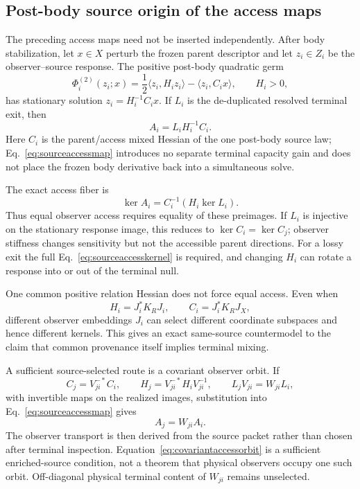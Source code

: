 \subsection{Post-body source origin of the access maps}

The preceding access maps need not be inserted independently. After body
stabilization, let $x\in X$ perturb the frozen parent descriptor and let
$z_i\in Z_i$ be the observer--source response. The positive post-body
quadratic germ
\begin{equation}
 \Phi_i^{(2)}(z_i;x)
 =\frac12\langle z_i,H_i z_i\rangle-\langle z_i,C_i x\rangle,
 \qquad H_i>0,
 \label{eq:accesssourcegerm}
\end{equation}
has stationary solution $z_i=H_i^{-1}C_i x$. If $L_i$ is the de-duplicated
resolved terminal exit, then
\begin{equation}
 \boxed{A_i=L_iH_i^{-1}C_i.}
 \label{eq:sourceaccessmap}
\end{equation}
Here $C_i$ is the parent/access mixed Hessian of the one post-body source law;
Eq.~\eqref{eq:sourceaccessmap} introduces no separate terminal capacity gain
and does not place the frozen body derivative back into a simultaneous solve.

The exact access fiber is
\begin{equation}
 \ker A_i=C_i^{-1}\!\left(H_i\ker L_i\right).
 \label{eq:sourceaccesskernel}
\end{equation}
Thus equal observer access requires equality of these preimages. If $L_i$ is
injective on the stationary response image, this reduces to
$\ker C_i=\ker C_j$; observer stiffness changes sensitivity but not the
accessible parent directions. For a lossy exit the full
Eq.~\eqref{eq:sourceaccesskernel} is required, and changing $H_i$ can rotate a
response into or out of the terminal null.

One common positive relation Hessian does not force equal access. Even when
\begin{equation}
 H_i=J_i^*K_RJ_i,
 \qquad C_i=J_i^*K_RJ_X,
 \label{eq:commonrelationhessian}
\end{equation}
different observer embeddings $J_i$ can select different coordinate
subspaces and hence different kernels. This gives an exact same-source
countermodel to the claim that common provenance itself implies terminal
mixing.

A sufficient source-selected route is a covariant observer orbit. If
\begin{equation}
 C_j=V_{ji}^{-*}C_i,\qquad
 H_j=V_{ji}^{-*}H_iV_{ji}^{-1},\qquad
 L_jV_{ji}=W_{ji}L_i,
 \label{eq:covariantaccessorbit}
\end{equation}
with invertible maps on the realized images, substitution into
Eq.~\eqref{eq:sourceaccessmap} gives
\begin{equation}
 A_j=W_{ji}A_i.
 \label{eq:sourceownedtransport}
\end{equation}
The observer transport is then derived from the source packet rather than
chosen after terminal inspection. Equation~\eqref{eq:covariantaccessorbit} is
a sufficient enriched-source condition, not a theorem that physical observers
occupy one such orbit. Off-diagonal physical terminal content of $W_{ji}$
remains unselected.

